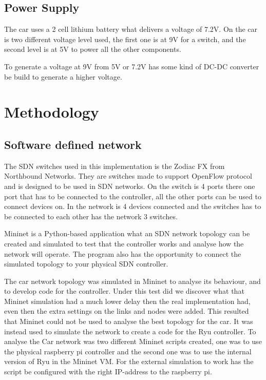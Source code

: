 \documentclass[11pt, titlepage]{article} %
\begin{document}

\subsection{Power Supply}
The car uses a 2 cell lithium battery what delivers a voltage of 7.2V. On the car is two different voltage level used, the first one is at 9V for a switch, and the second level is at 5V to power all the other components. 

To generate a voltage at 9V from 5V or 7.2V has some kind of DC-DC converter be build to generate a higher voltage. 


\clearpage
\section{Methodology}
\subsection{Software defined network}

The SDN switches used in this implementation is the Zodiac FX from Northbound Networks. They are switches made to support OpenFlow protocol and is designed to be used in SDN networks. On the switch is 4 ports there one port that has to be connected to the controller, all the other ports can be used to connect devices on. In the network is 4 devices connected and the switches has to be connected to each other has the network 3 switches. 

Mininet is a Python-based application what an SDN network topology can be created and simulated to test that the controller works and analyse how the network will operate. The program also has the opportunity to connect the simulated topology to your physical SDN controller. 

The car network topology was simulated in Mininet to analyse its behaviour, and to develop code for the controller. Under this test did we discover what that Mininet simulation had a much lower delay then the real implementation had, even then the extra settings on the links and nodes were added. This resulted that Mininet could not be used to analyse the best topology for the car. It was instead used to simulate the network to create a code for the Ryu controller. To analyse the Car network was two different Mininet scripts created, one was to use the physical raspberry pi controller and the second one was to use the internal version of Ryu in the Mininet VM. For the external simulation to work has the script be configured with the right IP-address to the raspberry pi. 
\end{document}
